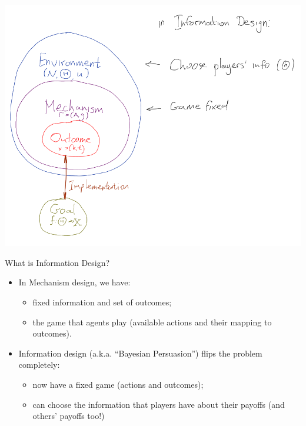 \documentclass[english,10pt
,aspectratio=169
]{beamer}
\begin{document}
\begin{frame}
	\centering
	\includegraphics[scale=0.32]{pics/M7/MD_vs_ID_3}
\end{frame}


\begin{frame}{What is Information Design?}
\begin{itemize}
	\item In Mechanism design, we have:
	\begin{itemize}
		\item \alert{fixed} information and set of outcomes;
		\item {} the game that agents play (available actions and their mapping to outcomes).
	\end{itemize}
	\item Information design (a.k.a. ``Bayesian Persuasion'') flips the problem completely:
	\begin{itemize}
		\item now have a fixed game (actions and outcomes);
		\item can choose the information that players have about their payoffs (and others' payoffs too!)
	\end{itemize}
\end{itemize}
\end{frame}
\end{document}
